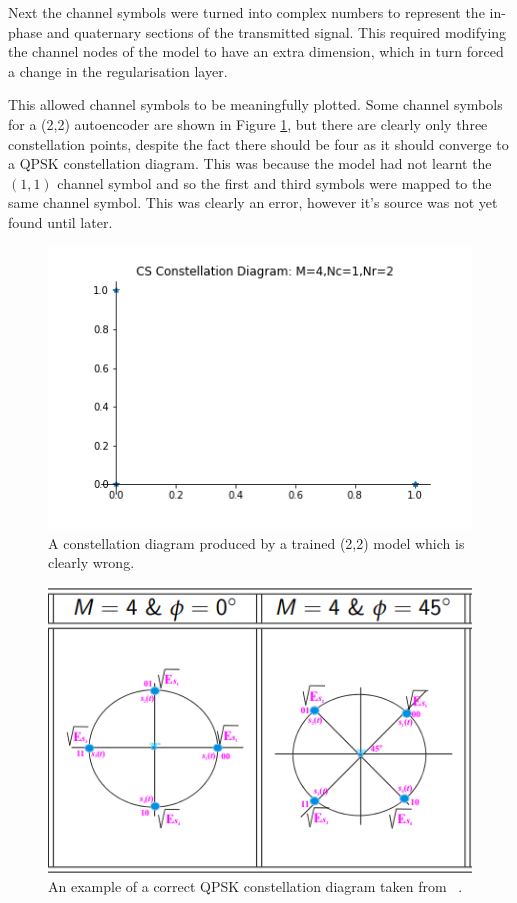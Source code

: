 \documentclass[12pt,onecolumn,letterpaper]{article}
\begin{document}
Next the channel symbols were turned into complex numbers to represent the in-phase and quaternary sections of the transmitted signal. This required modifying the channel nodes of the model to have an extra dimension, which in turn forced a change in the regularisation layer.

This allowed channel symbols to be meaningfully plotted. Some channel symbols for a (2,2) autoencoder are shown in Figure \ref{fig:WrongConstellationDiagram}, but there are clearly only three constellation points, despite the fact there should be four as it should converge to a QPSK constellation diagram. This was because the model had not learnt the $(1,1)$ channel symbol and so the first and third symbols were mapped to the same channel symbol. This was clearly an error, however it's source was not yet found until later. 

\begin{figure}[t]
\begin{center}
   \includegraphics[width=0.8\linewidth]{figures/wrong_constellation_diagram.png}
\end{center}
   \caption{A constellation diagram produced by a trained (2,2) model which is clearly wrong. }
\label{fig:WrongConstellationDiagram}
\end{figure}

\begin{figure}[t]
\begin{center}
   \includegraphics[width=0.8\linewidth]{figures/EE3-03_comms_systems_qpsk_constellation_diagram.PNG}
\end{center}
   \caption{An example of a correct QPSK constellation diagram taken from ~\cite{EE3CommsSystemsNotesL4}. }
\label{fig:CommsSystemsConstelDiagEg}
\end{figure}
\end{document}
